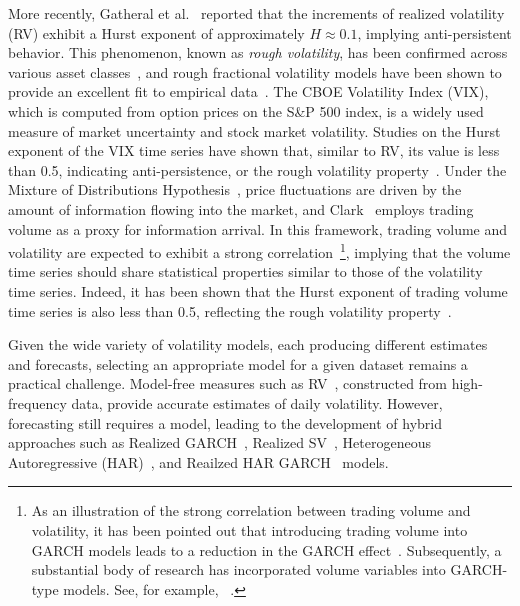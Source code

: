 \documentclass[preprints,article,accept,pdftex,oneauthor]{Definitions/mdpi}
\begin{document}
More recently, Gatheral et al.~\cite{gatheral2018volatility} reported that the increments of realized volatility (RV) exhibit a Hurst exponent of approximately $H \approx 0.1$, implying anti-persistent behavior. This phenomenon, known as \emph{rough volatility}, has been confirmed across various asset classes~\cite{bennedsen2022decoupling,livieri2018rough,takaishi2020rough,floc2022roughness,brandi2022multiscaling,mouti2024roughvolatilityevidencerange,takaishi2025multifractality}, and rough fractional volatility models have been shown to provide an excellent fit to empirical data~\cite{gatheral2018volatility}.
The CBOE Volatility Index (VIX), which is computed from option prices on the S\&P 500 index, is a widely used measure of market uncertainty and stock market volatility. Studies on the Hurst exponent of the VIX time series have shown that, similar to RV, its value is less than 0.5, indicating anti-persistence, or the rough volatility property~\cite{bariviera2023disentangling,takaishi2025impact,takaishi2026impact}.
Under the Mixture of Distributions Hypothesis~\cite{clark1973subordinated,tauchen1983price,andersen1996return}, price fluctuations are driven by the amount of information flowing into the market, and Clark~\cite{clark1973subordinated} employs trading volume as a proxy for information arrival. In this framework, trading volume and volatility are expected to exhibit a strong correlation~\footnote{As an illustration of the strong correlation between trading volume and volatility, it has been pointed out that introducing trading volume into GARCH models leads to a reduction in the GARCH effect~\cite{lamoureux1990heteroskedasticity}. Subsequently, a substantial body of research has incorporated volume variables into GARCH-type models. See, for example, ~\cite{sharma1996heteroscedasticity,brailsford1996empirical,miyakoshi2002arch,carroll2012trading,bessembinder1992futures,ureche2009more,bose2015examining,takaishi2016relationship}.}, implying that the volume time series should share statistical properties similar to those of the volatility time series. Indeed, it has been shown that the Hurst exponent of trading volume time series is also less than 0.5, reflecting the rough volatility property~\cite{takaishi2022Hurst}.


Given the wide variety of volatility models, each producing different estimates and forecasts, selecting an appropriate model for a given dataset remains a practical challenge. Model-free measures such as RV~\cite{andersen1998answering,andersen2003modeling,barndorff2002econometric,mcaleer2008realized}, constructed from high-frequency data, provide accurate estimates of daily volatility. However, forecasting still requires a model, leading to the development of hybrid approaches such as Realized GARCH~\cite{hansen2012realized,hansen2016exponential}, Realized SV~\cite{takahashi2009estimating,koopman2013analysis,takaishi2018bias}, Heterogeneous Autoregressive (HAR)~\cite{corsi2009simple}, and Reailzed HAR GARCH~\cite{huang2016modeling} models.
\end{document}
